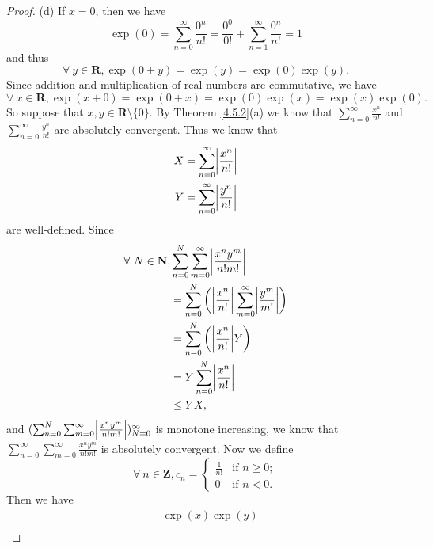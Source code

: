 \begin{proof}{(d)}
    If \(x = 0\), then we have
    \[
        \exp(0) = \sum_{n = 0}^\infty \frac{0^n}{n!} = \frac{0^0}{0!} + \sum_{n = 1}^\infty \frac{0^n}{n!} = 1
    \]
    and thus
    \[
        \forall\ y \in \mathbf{R}, \exp(0 + y) = \exp(y) = \exp(0) \exp(y).
    \]
    Since addition and multiplication of real numbers are commutative, we have
    \[
        \forall\ x \in \mathbf{R}, \exp(x + 0) = \exp(0 + x) = \exp(0) \exp(x) = \exp(x) \exp(0).
    \]
    So suppose that \(x, y \in \mathbf{R} \setminus \{0\}\).
    By Theorem \ref{4.5.2}(a) we know that \(\sum_{n = 0}^\infty \frac{x^n}{n!}\) and \(\sum_{n = 0}^\infty \frac{y^n}{n!}\) are absolutely convergent.
    Thus we know that
    \begin{align*}
        X & = \sum_{n = 0}^\infty \abs*{\frac{x^n}{n!}} \\
        Y & = \sum_{n = 0}^\infty \abs*{\frac{y^n}{n!}}
    \end{align*}
    are well-defined.
    Since
    \begin{align*}
        \forall\ N \in \mathbf{N}, & \sum_{n = 0}^N \sum_{m = 0}^\infty \abs*{\frac{x^n y^m}{n! m!}}                              \\
                                   & = \sum_{n = 0}^N \bigg(\abs*{\frac{x^n}{n!}} \sum_{m = 0}^\infty \abs*{\frac{y^m}{m!}}\bigg) \\
                                   & = \sum_{n = 0}^N \bigg(\abs*{\frac{x^n}{n!}} Y\bigg)                                         \\
                                   & = Y \sum_{n = 0}^N \abs*{\frac{x^n}{n!}}                                                     \\
                                   & \leq Y X,
    \end{align*}
    and \((\sum_{n = 0}^N \sum_{m = 0}^\infty \abs*{\frac{x^n y^m}{n! m!}})_{N = 0}^\infty\) is monotone increasing, we know that \(\sum_{n = 0}^\infty \sum_{m = 0}^\infty \frac{x^n y^m}{n! m!}\) is absolutely convergent.
    Now we define
    \[
        \forall\ n \in \mathbf{Z}, c_n = \begin{cases}
            \frac{1}{n!} & \text{if } n \geq 0; \\
            0            & \text{if } n < 0.
        \end{cases}
    \]
    Then we have
    \begin{align*}
         & \exp(x) \exp(y)                                                                                                                            \\

\end{align*}
\end{proof}
